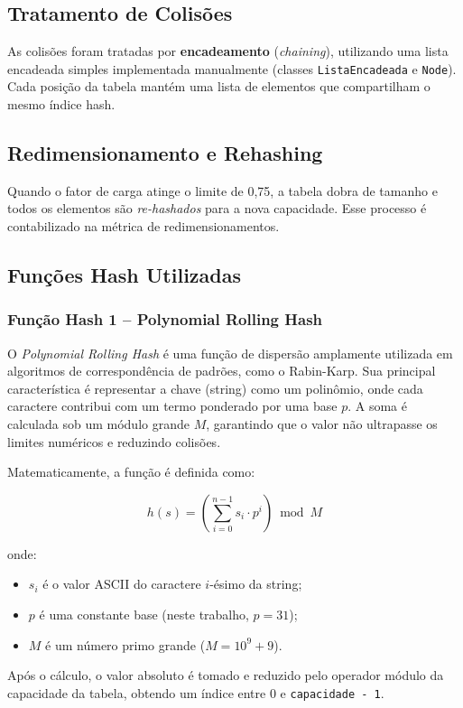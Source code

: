 \documentclass[12pt,a4paper]{abntex2}
\begin{document}
\subsection{Tratamento de Colisões}
As colisões foram tratadas por \textbf{encadeamento} (\textit{chaining}), utilizando uma lista encadeada simples implementada manualmente (classes \texttt{ListaEncadeada} e \texttt{Node}). Cada posição da tabela mantém uma lista de elementos que compartilham o mesmo índice hash.

\subsection{Redimensionamento e Rehashing}
Quando o fator de carga atinge o limite de 0,75, a tabela dobra de tamanho e todos os elementos são \textit{re-hashados}  para a nova capacidade. Esse processo é contabilizado na métrica de redimensionamentos.

\subsection{Funções Hash Utilizadas}

\subsubsection{Função Hash 1 -- Polynomial Rolling Hash}
O \textit{Polynomial Rolling Hash} é uma função de dispersão amplamente utilizada em algoritmos de correspondência de padrões, como o Rabin-Karp.
Sua principal característica é representar a chave (string) como um polinômio, onde cada caractere contribui com um termo ponderado por uma base \(p\).
A soma é calculada sob um módulo grande \(M\), garantindo que o valor não ultrapasse os limites numéricos e reduzindo colisões.

Matematicamente, a função é definida como:

\[
h(s) = \left( \sum_{i=0}^{n-1} s_i \cdot p^i \right) \bmod M
\]

onde:
\begin{itemize}
  \item \(s_i\) é o valor ASCII do caractere \(i\)-ésimo da string;
  \item \(p\) é uma constante base (neste trabalho, \(p = 31\));
  \item \(M\) é um número primo grande (\(M = 10^9 + 9\)).
\end{itemize}

Após o cálculo, o valor absoluto é tomado e reduzido pelo operador módulo da capacidade da tabela, obtendo um índice entre \(0\) e \texttt{capacidade - 1}.
\end{document}
